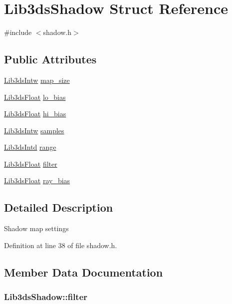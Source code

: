 \hypertarget{struct_lib3ds_shadow}{\section{Lib3ds\-Shadow Struct Reference}
\label{struct_lib3ds_shadow}
}


{\ttfamily \#include $<$shadow.\-h$>$}

\subsection*{Public Attributes}
\begin{DoxyCompactItemize}
\item 
\hyperlink{types_8h_ad6ca098afd6494c3cca6b63f136f59c8}{Lib3ds\-Intw} \hyperlink{struct_lib3ds_shadow_a7e124771540e7d69ad28e04a1fa38742}{map\-\_\-size}
\item 
\hyperlink{types_8h_ab18e70f51f9a53c9dee8d930c8e1a7bf}{Lib3ds\-Float} \hyperlink{struct_lib3ds_shadow_a49717e06c66589b5a2d653f87875fd19}{lo\-\_\-bias}
\item 
\hyperlink{types_8h_ab18e70f51f9a53c9dee8d930c8e1a7bf}{Lib3ds\-Float} \hyperlink{struct_lib3ds_shadow_aad58503f2e1e5577528e2b1d42154dd0}{hi\-\_\-bias}
\item 
\hyperlink{types_8h_ad6ca098afd6494c3cca6b63f136f59c8}{Lib3ds\-Intw} \hyperlink{struct_lib3ds_shadow_a7e3f9dc76ba3ab1d1146ccf39b572af3}{samples}
\item 
\hyperlink{types_8h_a5d92ad41149cf040ce2ee32cc2609403}{Lib3ds\-Intd} \hyperlink{struct_lib3ds_shadow_afacd589bbf81692f787d5f79d2fb424f}{range}
\item 
\hyperlink{types_8h_ab18e70f51f9a53c9dee8d930c8e1a7bf}{Lib3ds\-Float} \hyperlink{struct_lib3ds_shadow_a97e152c7981eec1388d7696f6a260311}{filter}
\item 
\hyperlink{types_8h_ab18e70f51f9a53c9dee8d930c8e1a7bf}{Lib3ds\-Float} \hyperlink{struct_lib3ds_shadow_a625297876f28255eeb4b9c006533671b}{ray\-\_\-bias}
\end{DoxyCompactItemize}


\subsection{Detailed Description}
Shadow map settings 

Definition at line 38 of file shadow.\-h.



\subsection{Member Data Documentation}
\hypertarget{struct_lib3ds_shadow_a97e152c7981eec1388d7696f6a260311}{
\subsubsection[{filter}]{ Lib3ds\-Shadow\-::filter}}\label{struct_lib3ds_shadow_a97e152c7981eec1388d7696f6a260311}



